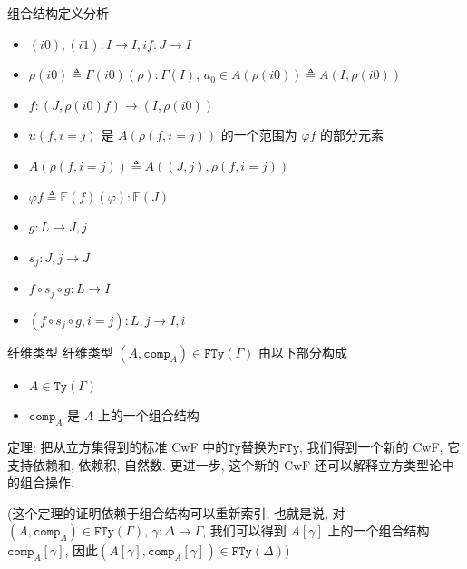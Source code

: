 \documentclass[aspectratio=169,xcolor=dvipsnames]{beamer}
\newcommand\bbF{\mathbb{F}}
\newcommand\FTy{\mathtt{FTy}}
\newcommand\comp{\mathtt{comp}}
\newcommand\Ty{\mathtt{Ty}}
\begin{document}
\begin{frame}[shrink]{组合结构定义分析}
  \begin{itemize}
    \item $(i0),(i1) : I\to I,i$\qquad $f:J \to I$
    \item $\rho(i0)\triangleq\Gamma(i0)(\rho) : \Gamma(I)$, $a_0\in A(\rho(i0))\triangleq A(I,\rho(i0))$
    \item $f : (J,\rho(i0)f) \to (I,\rho(i0))$
    \item $u(f,i=j)$ 是 $A(\rho(f,i=j))$ 的一个范围为 $\varphi f$ 的部分元素
    \item $A(\rho(f,i=j))\triangleq A((J,j),\rho(f,i=j))$
    \item $\varphi f\triangleq \bbF(f)(\varphi) : \bbF(J)$
    \item $g : L\to J,j$
    \item $s_j:J,j\to J$
    \item $f\circ s_j\circ g : L \to I$
    \item $(f\circ s_j\circ g,i=j) : L,j\to I,i$
  \end{itemize}
\end{frame}

\begin{frame}{纤维类型}
 纤维类型 $(A,\comp_{A})\in\FTy(\Gamma)$ 由以下部分构成
 \begin{itemize}
  \item $A\in\Ty(\Gamma)$
  \item $\comp_A$ 是 $A$ 上的一个组合结构
 \end{itemize}
\pause
 定理: 把从立方集得到的标准 CwF 中的$\Ty$替换为$\FTy$, 我们得到一个新的 CwF, 它支持依赖和, 依赖积, 自然数. 更进一步, 这个新的 CwF 还可以解释立方类型论中的组合操作.
\pause

 (这个定理的证明依赖于组合结构可以重新索引, 也就是说, 对 $(A,\comp_A)\in\FTy(\Gamma)$, $\gamma:\Delta\to\Gamma$, 我们可以得到 $A[\gamma]$ 上的一个组合结构$\comp_{A}[\gamma]$, 因此$(A[\gamma],\comp_{A}[\gamma])\in\FTy(\Delta)$)
\end{frame}
\end{document}
